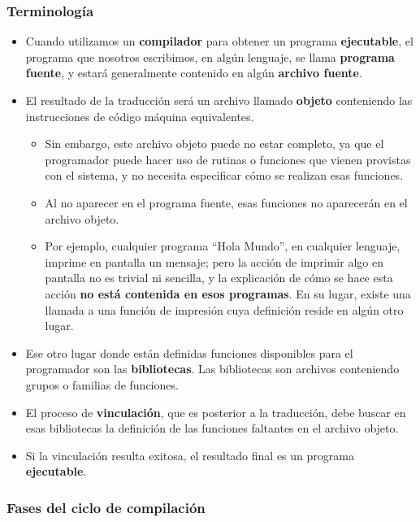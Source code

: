 \documentclass[spanish,a4paper,]{article}
\providecommand{\tightlist}{%
  \setlength{\itemsep}{0pt}\setlength{\parskip}{0pt}}
\begin{document}
\hypertarget{terminologuxeda}{%
\subsubsection{Terminología}\label{terminologuxeda}}

\begin{itemize}
\tightlist
\item
  Cuando utilizamos un \textbf{compilador} para obtener un programa
  \textbf{ejecutable}, el programa que nosotros escribimos, en algún
  lenguaje, se llama \textbf{programa fuente}, y estará generalmente
  contenido en algún \textbf{archivo fuente}.
\item
  El resultado de la traducción será un archivo llamado \textbf{objeto}
  conteniendo las instrucciones de código máquina equivalentes.

  \begin{itemize}
  \tightlist
  \item
    Sin embargo, este archivo objeto puede no estar completo, ya que el
    programador puede hacer uso de rutinas o funciones que vienen
    provistas con el sistema, y no necesita especificar cómo se realizan
    esas funciones.
  \item
    Al no aparecer en el programa fuente, esas funciones no aparecerán
    en el archivo objeto.\\
  \item
    Por ejemplo, cualquier programa ``Hola Mundo'', en cualquier
    lenguaje, imprime en pantalla un mensaje; pero la acción de imprimir
    algo en pantalla no es trivial ni sencilla, y la explicación de cómo
    se hace esta acción \textbf{no está contenida en esos programas}. En
    su lugar, existe una llamada a una función de impresión cuya
    definición reside en algún otro lugar.
  \end{itemize}
\item
  Ese otro lugar donde están definidas funciones disponibles para el
  programador son las \textbf{bibliotecas}. Las bibliotecas son archivos
  conteniendo grupos o familias de funciones.
\item
  El proceso de \textbf{vinculación}, que es posterior a la traducción,
  debe buscar en esas bibliotecas la definición de las funciones
  faltantes en el archivo objeto.
\item
  Si la vinculación resulta exitosa, el resultado final es un programa
  \textbf{ejecutable}.
\end{itemize}

\hypertarget{fases-del-ciclo-de-compilaciuxf3n}{%
\subsubsection{Fases del ciclo de
compilación}\label{fases-del-ciclo-de-compilaciuxf3n}}
\end{document}
